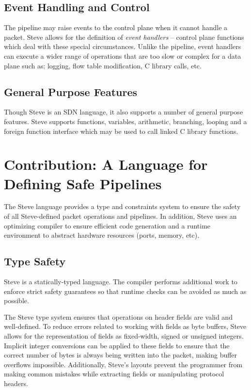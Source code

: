 \subsection{Event Handling and Control}

The pipeline may raise events to the control plane when
it cannot handle a packet. Steve allows for the definition of
\emph{event handlers} -- control plane functions which deal
with these special circumstances.
Unlike the pipeline, event handlers can execute a wider range of
operations that are too slow or complex for a data plane such as:
logging, flow table modification, C library calls, etc.

\subsection{General Purpose Features}

Though Steve is an SDN language, it also supports a number of general purpose
features.
Steve supports functions, variables, arithmetic, branching,
looping and a foreign function interface which may be used to call linked C
library functions.

\section{Contribution: A Language for Defining Safe Pipelines}

The Steve language provides a type and constraints system to ensure the safety
of all Steve-defined packet operations and pipelines.
In addition, Steve uses an optimizing compiler to ensure efficient code
generation
and a runtime environment to abstract hardware resources (ports, memory, etc).

\subsection{Type Safety}

Steve is a statically-typed language. The compiler performs additional work to
enforce strict safety guarantees so that runtime checks can be avoided as much
as possible.

The Steve type system ensures that operations on header fields are valid and
well-defined.
To reduce errors related to working with fields as byte buffers, Steve allows
for the representation of fields as fixed-width, signed or unsigned
integers.
Implicit integer conversions can be applied to these fields to ensure that the correct number of bytes is always being written into the packet, making buffer overflows impossible.
Additionally, Steve's layouts prevent the programmer from making common mistakes while extracting fields or manipulating protocol headers.


